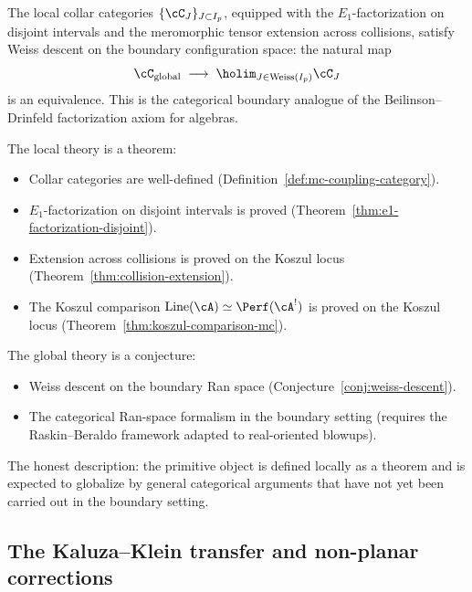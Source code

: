 \begin{conjecture}
\label{conj:weiss-descent}
The local collar categories $\{\cC_J\}_{J \subset I_p}$,
equipped with the $E_1$-factorization on disjoint intervals and the
meromorphic tensor extension across collisions, satisfy Weiss
descent on the boundary configuration space: the natural map
\[
  \cC_{\mathrm{global}}
  \;\longrightarrow\;
  \holim_{J \in \mathrm{Weiss}(I_p)} \cC_J
\]
is an equivalence.  This is the categorical boundary analogue of
the Beilinson--Drinfeld factorization axiom for algebras.
\end{conjecture}

\begin{remark}
\label{rem:local-vs-global-honest}
The local theory is a theorem:
\begin{itemize}[nosep]
\item Collar categories are well-defined
  (Definition~\ref{def:mc-coupling-category}).
\item $E_1$-factorization on disjoint intervals is proved
  (Theorem~\ref{thm:e1-factorization-disjoint}).
\item Extension across collisions is proved on the Koszul locus
  (Theorem~\ref{thm:collision-extension}).
\item The Koszul comparison $\operatorname{Line}(\cA)
  \simeq \Perf(\cA^!)$ is proved on the Koszul locus
  (Theorem~\ref{thm:koszul-comparison-mc}).
\end{itemize}
The global theory is a conjecture:
\begin{itemize}[nosep]
\item Weiss descent on the boundary Ran space
  (Conjecture~\ref{conj:weiss-descent}).
\item The categorical Ran-space formalism in the boundary setting
  (requires the Raskin--Beraldo framework adapted to
  real-oriented blowups).
\end{itemize}
The honest description: the primitive object is defined locally
as a theorem and is expected to globalize by general categorical
arguments that have not yet been carried out in the boundary
setting.
\end{remark}

\subsection{The Kaluza--Klein transfer and non-planar corrections}
\label{subsec:kk-transfer-nonplanar}


